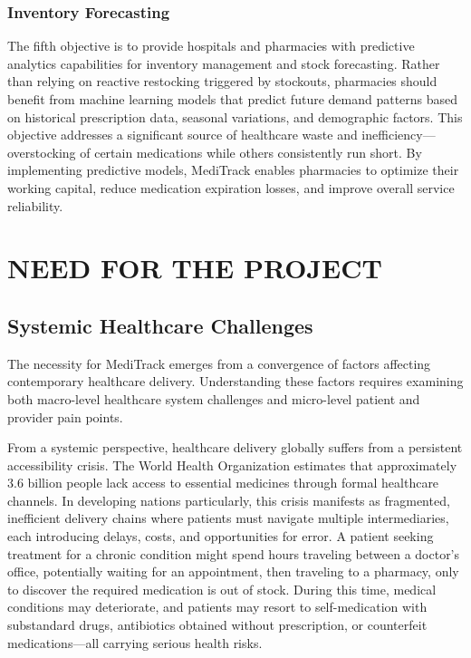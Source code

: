 \documentclass[12pt,a4paper]{report}
\begin{document}
\subsubsection{Inventory Forecasting}

The fifth objective is to provide hospitals and pharmacies with predictive analytics capabilities for inventory management and stock forecasting. Rather than relying on reactive restocking triggered by stockouts, pharmacies should benefit from machine learning models that predict future demand patterns based on historical prescription data, seasonal variations, and demographic factors. This objective addresses a significant source of healthcare waste and inefficiency---overstocking of certain medications while others consistently run short. By implementing predictive models, MediTrack enables pharmacies to optimize their working capital, reduce medication expiration losses, and improve overall service reliability.

\section{NEED FOR THE PROJECT}

\subsection{Systemic Healthcare Challenges}

The necessity for MediTrack emerges from a convergence of factors affecting contemporary healthcare delivery. Understanding these factors requires examining both macro-level healthcare system challenges and micro-level patient and provider pain points.

From a systemic perspective, healthcare delivery globally suffers from a persistent accessibility crisis. The World Health Organization estimates that approximately 3.6 billion people lack access to essential medicines through formal healthcare channels. In developing nations particularly, this crisis manifests as fragmented, inefficient delivery chains where patients must navigate multiple intermediaries, each introducing delays, costs, and opportunities for error. A patient seeking treatment for a chronic condition might spend hours traveling between a doctor's office, potentially waiting for an appointment, then traveling to a pharmacy, only to discover the required medication is out of stock. During this time, medical conditions may deteriorate, and patients may resort to self-medication with substandard drugs, antibiotics obtained without prescription, or counterfeit medications---all carrying serious health risks.
\end{document}
